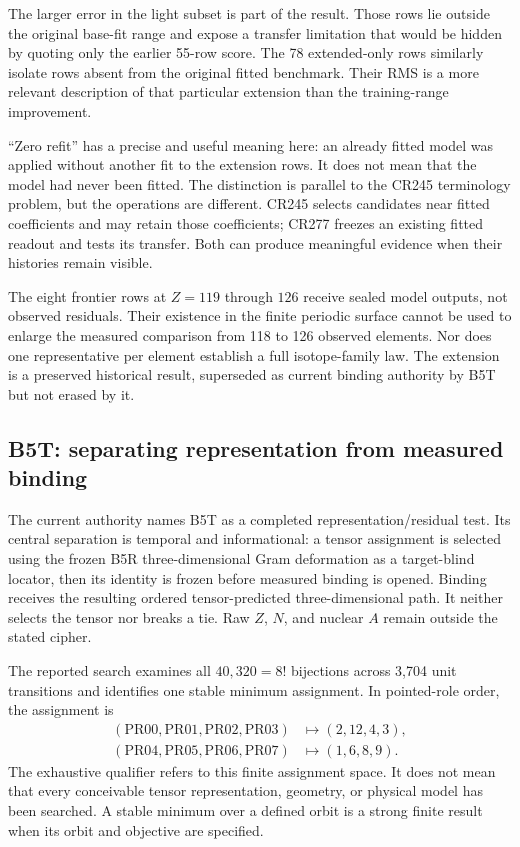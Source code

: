 The larger error in the light subset is part of the result. Those rows lie outside the original base-fit range and expose a transfer limitation that would be hidden by quoting only the earlier 55-row score. The 78 extended-only rows similarly isolate rows absent from the original fitted benchmark. Their RMS is a more relevant description of that particular extension than the training-range improvement.

``Zero refit'' has a precise and useful meaning here: an already fitted model was applied without another fit to the extension rows. It does not mean that the model had never been fitted. The distinction is parallel to the CR245 terminology problem, but the operations are different. CR245 selects candidates near fitted coefficients and may retain those coefficients; CR277 freezes an existing fitted readout and tests its transfer. Both can produce meaningful evidence when their histories remain visible.

The eight frontier rows at $Z=119$ through $126$ receive sealed model outputs, not observed residuals. Their existence in the finite periodic surface cannot be used to enlarge the measured comparison from 118 to 126 observed elements. Nor does one representative per element establish a full isotope-family law. The extension is a preserved historical result, superseded as current binding authority by B5T but not erased by it.

\subsection{B5T: separating representation from measured binding}
\label{v2c5:b5t}

The current authority names B5T as a completed representation/residual test. Its central separation is temporal and informational: a tensor assignment is selected using the frozen B5R three-dimensional Gram deformation as a target-blind locator, then its identity is frozen before measured binding is opened. Binding receives the resulting ordered tensor-predicted three-dimensional path. It neither selects the tensor nor breaks a tie. Raw $Z$, $N$, and nuclear $A$ remain outside the stated cipher.\cite{viibinding}

The reported search examines all $40{,}320=8!$ bijections across 3,704 unit transitions and identifies one stable minimum assignment. In pointed-role order, the assignment is
\begin{align}
 (\mathrm{PR00},\mathrm{PR01},\mathrm{PR02},\mathrm{PR03})
 &\longmapsto(2,12,4,3),\nonumber\\
 (\mathrm{PR04},\mathrm{PR05},\mathrm{PR06},\mathrm{PR07})
 &\longmapsto(1,6,8,9).
 \label{v2c5:assignment}
\end{align}
The exhaustive qualifier refers to this finite assignment space. It does not mean that every conceivable tensor representation, geometry, or physical model has been searched. A stable minimum over a defined orbit is a strong finite result when its orbit and objective are specified.

